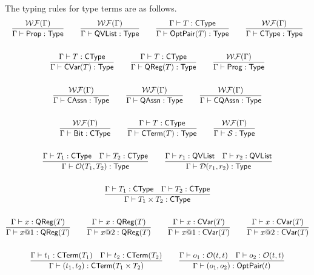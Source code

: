 The typing rules for type terms are as follows.
\begin{gather*}
    \frac{\WF{\Gamma}}{\Gamma \vdash \prop : \Type}
    \qquad
    \frac{\WF{\Gamma}}{\Gamma \vdash \qvlist : \Type}
    \qquad
    \frac{\Gamma \vdash T : \CType}{\Gamma \vdash \optpair{T} : \Type}
    \qquad
    \frac{\WF{\Gamma}}{\Gamma \vdash \CType : \Type} \\
    \\
    \frac{\Gamma \vdash T : \CType}{\Gamma \vdash \cvar{T} : \Type}
    \qquad
    \frac{\Gamma \vdash T : \CType}{\Gamma \vdash \qreg{T} : \Type}
    \qquad
    \frac{\WF{\Gamma}}{\Gamma \vdash \prog : \Type} \\
    \\
    \frac{\WF{\Gamma}}{\Gamma \vdash \cAssn : \Type}
    \qquad
    \frac{\WF{\Gamma}}{\Gamma \vdash \qAssn : \Type}
    \qquad
    \frac{\WF{\Gamma}}{\Gamma \vdash \cqAssn : \Type} \\
    \\
    \frac{\WF{\Gamma}}{\Gamma \vdash \bit : \CType}
    \qquad
    \frac{\Gamma \vdash T : \CType}{\Gamma \vdash \CTerm{T} : \Type }
    \qquad
    \frac{\WF{\Gamma}}{\Gamma \vdash \SType : \Type} \\
    \\
    \frac{\Gamma \vdash T_1 : \CType \quad \Gamma \vdash T_2 : \CType}{\Gamma \vdash \opt{T_1}{T_2} : \Type}
    \qquad
    \frac{\Gamma \vdash r_1 : \qvlist \quad \Gamma \vdash r_2 : \qvlist}{\Gamma \vdash \ldirac{r_1}{r_2} : \Type} \\
    \\
    \frac{\Gamma \vdash T_1 : \CType \quad \Gamma \vdash T_2 : \CType}{\Gamma \vdash T_1 \times T_2 : \CType} \\
    \\
    \frac{\Gamma \vdash x : \qreg{T}}{\Gamma \vdash x@1 : \qreg{T}}
    \qquad
    \frac{\Gamma \vdash x : \qreg{T}}{\Gamma \vdash x@2 : \qreg{T}}
    \qquad
    \frac{\Gamma \vdash x : \cvar{T}}{\Gamma \vdash x@1 : \cvar{T}}
    \qquad
    \frac{\Gamma \vdash x : \cvar{T}}{\Gamma \vdash x@2 : \cvar{T}}
    \\
    \\
    \frac{
    \Gamma \vdash t_1 : \CTerm{T_1} \quad \Gamma \vdash t_2 : \CTerm{T_2}
    }
    {\Gamma \vdash (t_1, t_2) : \CTerm{T_1 \times T_2}}
    \qquad
    \frac{\Gamma \vdash o_1 : \opt{t}{t} \quad \Gamma \vdash o_2 : \opt{t}{t}}{\Gamma \vdash (o_1, o_2) : \optpair{t}} \\
    \\

\end{gather*}
